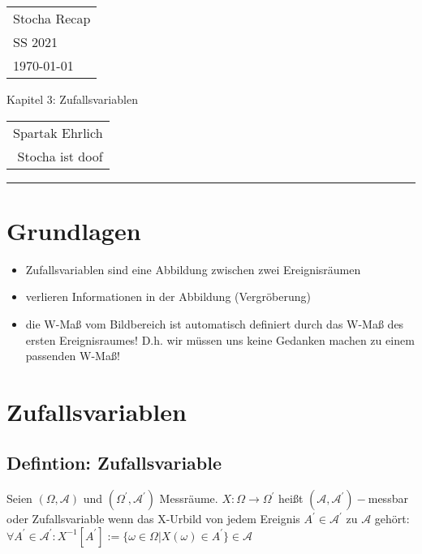 \documentclass[a4paper,11pt]{scrartcl}
\begin{document}
{\raggedright
\begin{tabular}{l}
    Stocha Recap \\
    SS 2021 \\
    \today{}
\end{tabular}}
\hfill
{\Large Kapitel 3: Zufallsvariablen}
\hfill
\begin{tabular}{r}
    Spartak Ehrlich \\
    Stocha ist doof
\end{tabular}
\hrule

\section{Grundlagen}

\begin{itemize}
    \item Zufallsvariablen sind eine Abbildung zwischen zwei Ereignisräumen
    \item verlieren Informationen in der Abbildung (Vergröberung)
    \item die W-Maß vom Bildbereich ist automatisch definiert durch das W-Maß des ersten Ereignisraumes! D.h. wir müssen uns keine Gedanken machen zu einem passenden W-Maß!
\end{itemize}

\section{Zufallsvariablen}

\subsection{Defintion: Zufallsvariable}

Seien $(\Omega,\mathcal{A})$ und $(\Omega^{\prime},\mathcal{A}^{\prime})$ Messräume.
$X : \Omega \rightarrow \Omega^{\prime}$ heißt $(\mathcal{A},\mathcal{A}^{\prime})-$messbar oder Zufallsvariable wenn das X-Urbild von jedem Ereignis $A^{\prime} \in \mathcal{A}^{\prime}$ zu $\mathcal{A}$ gehört: $\forall A^{\prime} \in \mathcal{A}^{\prime}: X^{-1}[A^{\prime}] := \{\omega \in \Omega | X(\omega) \in A^{\prime}\} \in \mathcal{A}$
\end{document}
